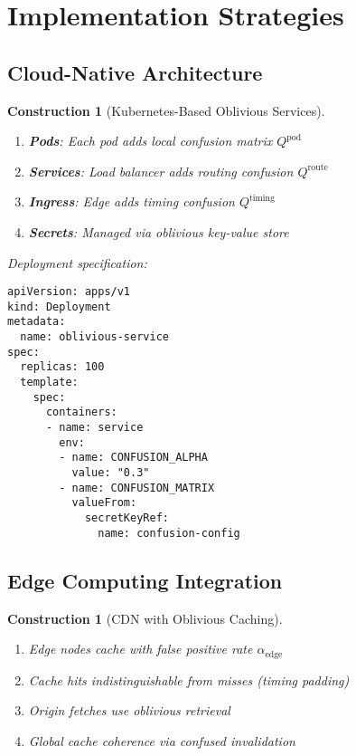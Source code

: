 \documentclass[11pt,final]{article}
\newtheorem{construction}[theorem]{Construction}
\begin{document}
\section{Implementation Strategies}

\subsection{Cloud-Native Architecture}

\begin{construction}[Kubernetes-Based Oblivious Services]
\begin{enumerate}
    \item \textbf{Pods}: Each pod adds local confusion matrix $Q^{\text{pod}}$
    \item \textbf{Services}: Load balancer adds routing confusion $Q^{\text{route}}$
    \item \textbf{Ingress}: Edge adds timing confusion $Q^{\text{timing}}$
    \item \textbf{Secrets}: Managed via oblivious key-value store
\end{enumerate}

Deployment specification:
\begin{verbatim}
apiVersion: apps/v1
kind: Deployment
metadata:
  name: oblivious-service
spec:
  replicas: 100
  template:
    spec:
      containers:
      - name: service
        env:
        - name: CONFUSION_ALPHA
          value: "0.3"
        - name: CONFUSION_MATRIX
          valueFrom:
            secretKeyRef:
              name: confusion-config
\end{verbatim}
\end{construction}

\subsection{Edge Computing Integration}

\begin{construction}[CDN with Oblivious Caching]
\begin{enumerate}
    \item Edge nodes cache with false positive rate $\alpha_{\text{edge}}$
    \item Cache hits indistinguishable from misses (timing padding)
    \item Origin fetches use oblivious retrieval
    \item Global cache coherence via confused invalidation
\end{enumerate}
\end{construction}
\end{document}
